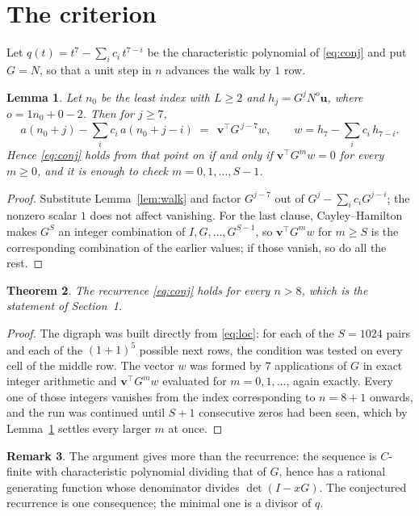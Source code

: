 \documentclass[11pt,a4paper]{article}
\theoremstyle{plain}
\newtheorem{theorem}{Theorem}
\newtheorem{lemma}[theorem]{Lemma}
\theoremstyle{definition}
\newtheorem{remark}[theorem]{Remark}
\begin{document}
\section{The criterion}

Let $q(t)=t^{7}-\sum_i c_i\,t^{7-i}$ be the characteristic polynomial of
\eqref{eq:conj} and put $G=N$, so that a unit step in $n$ advances the walk by
$1$ row.

\begin{lemma}\label{lem:crit}
Let $n_0$ be the least index with $L\ge2$ and $h_j=G^{j}N^{o}\mathbf{u}$, where
$o=1n_0+0-2$. Then for $j\ge7$,
\[
a(n_0+j)-\sum_i c_i\,a(n_0+j-i)\;=\;\,\mathbf{v}^{\!\top}G^{\,j-7}w,
\qquad w=h_{7}-\sum_i c_i\,h_{7-i} .
\]
Hence \eqref{eq:conj} holds from that point on if and only if
$\mathbf{v}^{\!\top}G^{m}w=0$ for every $m\ge0$, and it is enough to check
$m=0,1,\dots,S-1$.
\end{lemma}

\begin{proof}
Substitute Lemma~\ref{lem:walk} and factor $G^{j-7}$ out of
$G^{j}-\sum_ic_iG^{j-i}$; the nonzero scalar $1$ does not affect
vanishing. For the last clause, Cayley--Hamilton makes $G^{S}$ an integer combination of
$I,G,\dots,G^{S-1}$, so $\mathbf{v}^{\!\top}G^{m}w$ for $m\ge S$ is the corresponding
combination of the earlier values; if those vanish, so do all the rest.
\end{proof}

\begin{theorem}
The recurrence \eqref{eq:conj} holds for every $n>8$, which is the statement of
Section~1.
\end{theorem}

\begin{proof}
The digraph was built directly from \eqref{eq:loc}: for each of the $S=1024$ pairs and each
of the $(1+1)^{5}$ possible next rows, the condition was tested on every cell of
the middle row. The vector $w$ was formed by $7$ applications of $G$ in exact integer
arithmetic and $\mathbf{v}^{\!\top}G^{m}w$ evaluated for $m=0,1,\dots$, again exactly.
Every one of those integers vanishes from the index corresponding to $n=8+1$ onwards,
and the run was continued until $S+1$ consecutive zeros had been seen, which by
Lemma~\ref{lem:crit} settles every larger $m$ at once.
\end{proof}

\begin{remark}
The argument gives more than the recurrence: the sequence is $C$-finite with characteristic
polynomial dividing that of $G$, hence has a rational generating function whose denominator
divides $\det(I-xG)$. The conjectured recurrence is one consequence; the minimal one is a
divisor of $q$.
\end{remark}
\end{document}
